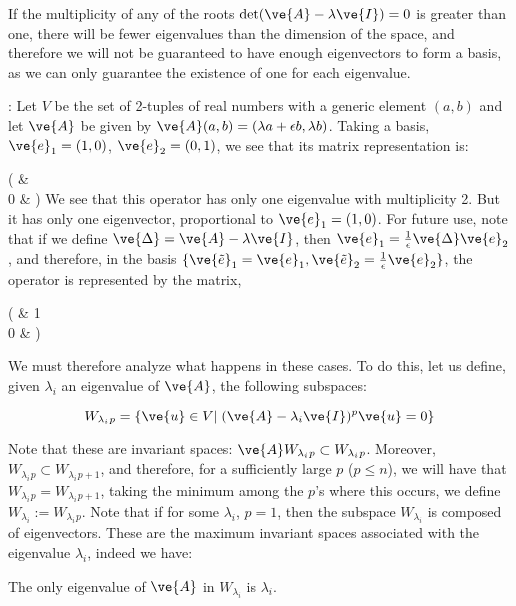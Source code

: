 If the multiplicity of any of the roots $\det(\ve{A}-\lambda\ve{I})=0$ is 
greater than one, there will be fewer eigenvalues than the dimension of the space, and therefore we will not be guaranteed to have enough eigenvectors to form a basis, as we can only guarantee the existence of one for each eigenvalue.

\ejem: Let $V$ be the set of 2-tuples of real numbers with a generic element
$(a,b)$ and let $\ve{A}$ be given by $\ve{A}(a,b) = (\lambda a+\epsilon b,\lambda b)$. Taking a basis, 
$\ve{e}_1=(1,0)$, 
$\ve{e}_2=(0,1)$, we see that its matrix representation is:

\beq\left(
     \lambda & \epsilon    \\
     0 &  \lambda
     \earr\right)
\eeq
%
We see that this operator has only one eigenvalue with multiplicity 2. But it has only one eigenvector, proportional to $\ve{e}_1=(1,0)$. For future use, note that if we define 
$\ve{\Delta} = \ve{A}-\lambda \ve{I}$, then $\ve{e}_{1} = \frac{1}{\epsilon}\ve{\Delta}\ve{e}_2$,
and therefore, in the basis $\{\ve{\tilde{e}}_{1} = \ve{e}_{1}, \ve{\tilde{e}}_{2} = \frac{1}{\epsilon}\ve{e}_{2}\}$,
the operator is represented by the matrix,

\beq\left(
     \lambda & 1    \\
     0 &  \lambda
     \earr\right)
\eeq

\espa

We must therefore analyze what happens in these cases. 
To do this, let us define, 
given $\lambda_i$ an eigenvalue of $\ve{A}$, the 
following subspaces:

\begin{equation}
  \label{eq:W_lm}
  W_{\lambda_i}{}_p = \{ \ve{u} \in V | \; (\ve{A} - \lambda_i \ve{I})^p \ve{u} = 0 \}
\end{equation}

Note that these are invariant spaces: 
$\ve{A} W_{\lambda_i}{}_p \subset W_{\lambda_i}{}_p$.
Moreover, $W_{\lambda_i}{}_p \subset W_{\lambda_i}{}_{p+1}$, and therefore, for a sufficiently large $p$ ($p \leq n$), we will have that 
$W_{\lambda_i}{}_p = W_{\lambda_i}{}_{p+1}$, taking the minimum among the
$p$'s where this occurs, we define $W_{\lambda_i} := W_{\lambda_i}{}_p$.
Note that if for some $\lambda_i$, $p=1$, then the subspace $W_{\lambda_i}$
is composed of eigenvectors.
These are the maximum invariant spaces associated with the eigenvalue $\lambda_i$,
indeed we have:

\blem
The only eigenvalue of $\ve{A}$ in $W_{\lambda_i}$ is $\lambda_i$.
\elem

